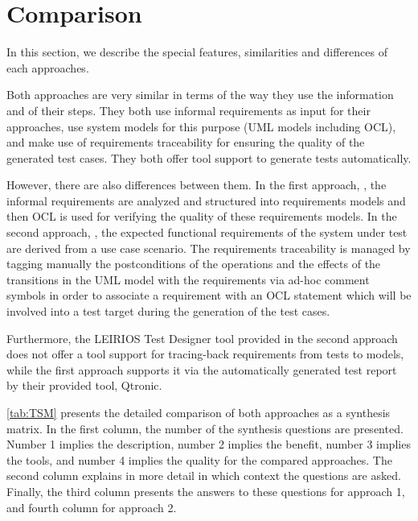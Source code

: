 \newpage
\section{Comparison}
\label{sec:Compar}

In this section, we describe the special features, similarities and differences of each approaches.

Both approaches are very similar in terms of the way they use the information and of their steps. They both use informal requirements as input for their approaches, use system models for this purpose (UML models including OCL), and make use of requirements traceability for ensuring the quality of the generated test cases. They both offer tool support to generate tests automatically. 

However, there are also differences between them. In the first approach, \cite{Paper1}, the informal requirements are analyzed and structured into requirements models and then OCL is used for verifying the quality of these requirements models.
In the second approach, \cite{Paper2}, the expected functional requirements of the system under test are derived from a use case scenario. The requirements traceability is managed by tagging manually the postconditions of the operations and the effects of the transitions in the UML model with the requirements via ad-hoc comment symbols in order to associate a requirement with an OCL statement which will be involved into a test target during the generation of the test cases.

Furthermore, the LEIRIOS Test Designer tool provided in the second approach does not offer a tool support for tracing-back requirements from tests to models, while the first approach supports it via the automatically generated test report by their provided tool, Qtronic.

\autoref{tab:TSM} presents the detailed comparison of both approaches as a synthesis matrix. In the first column, the number of the synthesis questions are presented. Number 1 implies the description, number 2 implies the benefit, number 3 implies the tools, and number 4 implies the quality for the compared approaches. The second column explains in more detail in which context the questions are asked. Finally, the third column presents the answers to these questions for approach 1, and fourth column for approach 2. 

